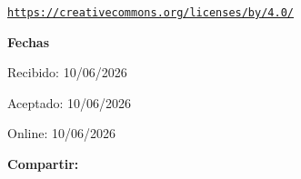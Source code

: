 \documentclass{article}
\begin{document}
\begin{textblock*}{68mm}
{\begin{minipage}[t]{68mm}
{\scriptsize\texttt{\href{https://creativecommons.org/licenses/by/4.0/}{https://creativecommons.org/licenses/by/4.0/}}}\par
\vspace{6pt}
{\bfseries\color{azulrevista!70}Fechas}\par\vspace{2pt}
Recibido: 10/06/2026\par
Aceptado: 10/06/2026\par
Online: 10/06/2026\par
\vspace{6pt}
\vspace{6pt}
{\bfseries\color{azulrevista!70}Compartir:}\par\vspace{3pt}
{\large
\href{https://bsky.app/intent/compose?text=https%3A%2F%2Fwww.redalyc.org%2Fjournal%2F4136%2F413677448001%2Fhtml%2F}{}~
\href{mailto:?subject=Desigualdad%20digital%20y%20rendimiento%20acad%C3%A9mico%20en%20la%20educaci%C3%B3n%20superior%3A%20un%20estudio%20comparativo%20en%20universidades%20p%C3%BAblicas%20de%20Argentina%20y%20M%C3%A9xico&body=https%3A%2F%2Fwww.redalyc.org%2Fjournal%2F4136%2F413677448001%2Fhtml%2F}{}~
\href{https://www.facebook.com/sharer/sharer.php?u=https%3A%2F%2Fwww.redalyc.org%2Fjournal%2F4136%2F413677448001%2Fhtml%2F}{}~
\href{https://www.linkedin.com/sharing/share-offsite/?url=https%3A%2F%2Fwww.redalyc.org%2Fjournal%2F4136%2F413677448001%2Fhtml%2F}{}~
\href{https://www.reddit.com/submit?url=https%3A%2F%2Fwww.redalyc.org%2Fjournal%2F4136%2F413677448001%2Fhtml%2F&title=Desigualdad%20digital%20y%20rendimiento%20acad%C3%A9mico%20en%20la%20educaci%C3%B3n%20superior%3A%20un%20estudio%20comparativo%20en%20universidades%20p%C3%BAblicas%20de%20Argentina%20y%20M%C3%A9xico}{}~
\href{https://www.researchgate.net/search?q=Desigualdad%20digital%20y%20rendimiento%20acad%C3%A9mico%20en%20la%20educaci%C3%B3n%20superior%3A%20un%20estudio%20comparativo%20en%20universidades%20p%C3%BAblicas%20de%20Argentina%20y%20M%C3%A9xico}{}~
\href{https://t.me/share/url?url=https%3A%2F%2Fwww.redalyc.org%2Fjournal%2F4136%2F413677448001%2Fhtml%2F&text=Desigualdad%20digital%20y%20rendimiento%20acad%C3%A9mico%20en%20la%20educaci%C3%B3n%20superior%3A%20un%20estudio%20comparativo%20en%20universidades%20p%C3%BAblicas%20de%20Argentina%20y%20M%C3%A9xico}{}~
}
\end{minipage}}
\end{textblock*}
\end{document}
